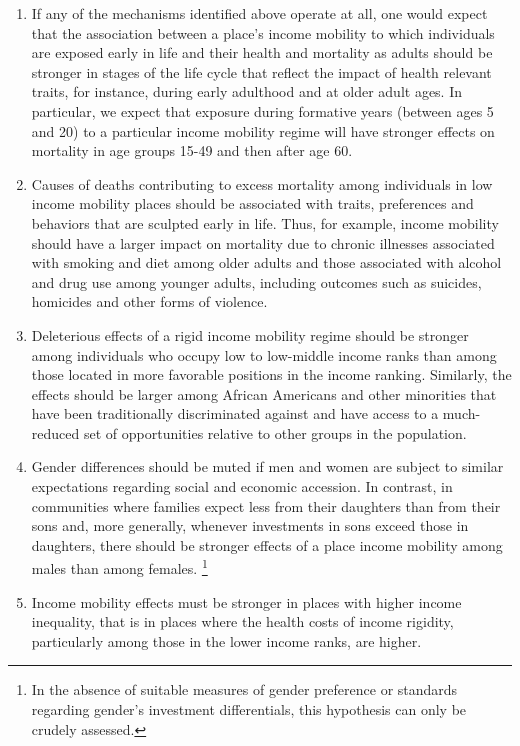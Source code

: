 \documentclass[11pt]{article}
\begin{document}
\begin{enumerate}
    \item If any of the mechanisms identified above operate at all, one would expect that the association between a place's income mobility to which individuals are exposed early in life and their health and mortality as adults should be stronger in stages of the life cycle that reflect the impact of health relevant traits, for instance, during early adulthood and at older adult ages. In particular, we expect that exposure during formative years (between ages 5 and 20) to a particular income mobility regime will have stronger effects on mortality in age groups 15-49 and then after age 60.
    \item Causes of deaths contributing to excess mortality among individuals in low income mobility places should be associated with traits, preferences and behaviors that are sculpted early in life. Thus, for example, income mobility should have a larger impact on mortality due to chronic illnesses associated with smoking and diet among older adults and those associated with alcohol and drug use among younger adults, including outcomes such as suicides, homicides and other forms of violence.
    \item Deleterious effects of a rigid income mobility regime should be stronger among individuals who occupy low to low-middle income ranks than among those located in more favorable positions in the income ranking. Similarly, the effects should be larger among African Americans and other minorities that have been traditionally discriminated against and have access to a much-reduced set of opportunities relative to other groups in the population.
    \item  Gender differences should be muted if men and women are subject to similar expectations regarding social and economic accession. In contrast, in communities where families expect less from their daughters than from their sons and, more generally, whenever investments in sons exceed those in daughters, there should be stronger effects of a place income mobility among males than among females. \footnote{In the absence of suitable measures of gender preference or standards regarding gender's investment differentials, this hypothesis can only be crudely assessed.}
    \item Income mobility effects must be stronger in places with higher income inequality, that is in places where the health costs of income rigidity, particularly among those in the lower income ranks, are higher.

\end{enumerate}
\end{document}
